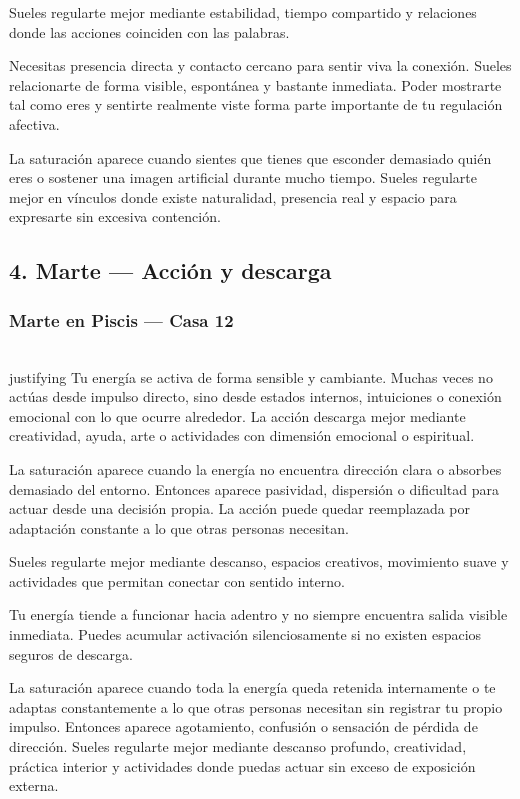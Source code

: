\documentclass[11pt,a4paper]{article}
\begin{document}
Sueles regularte mejor mediante estabilidad, tiempo compartido y relaciones donde las acciones coinciden con las palabras.

Necesitas presencia directa y contacto cercano para sentir viva la conexión. Sueles relacionarte de forma visible, espontánea y bastante inmediata. Poder mostrarte tal como eres y sentirte realmente viste forma parte importante de tu regulación afectiva.

La saturación aparece cuando sientes que tienes que esconder demasiado quién eres o sostener una imagen artificial durante mucho tiempo. Sueles regularte mejor en vínculos donde existe naturalidad, presencia real y espacio para expresarte sin excesiva contención.

\vspace{0.8cm}

\subsection{4. Marte — Acción y descarga}

\subsubsection*{Marte en Piscis — Casa 12}

\\justifying
Tu energía se activa de forma sensible y cambiante. Muchas veces no actúas desde impulso directo, sino desde estados internos, intuiciones o conexión emocional con lo que ocurre alrededor. La acción descarga mejor mediante creatividad, ayuda, arte o actividades con dimensión emocional o espiritual.

La saturación aparece cuando la energía no encuentra dirección clara o absorbes demasiado del entorno. Entonces aparece pasividad, dispersión o dificultad para actuar desde una decisión propia. La acción puede quedar reemplazada por adaptación constante a lo que otras personas necesitan.

Sueles regularte mejor mediante descanso, espacios creativos, movimiento suave y actividades que permitan conectar con sentido interno.

Tu energía tiende a funcionar hacia adentro y no siempre encuentra salida visible inmediata. Puedes acumular activación silenciosamente si no existen espacios seguros de descarga.

La saturación aparece cuando toda la energía queda retenida internamente o te adaptas constantemente a lo que otras personas necesitan sin registrar tu propio impulso. Entonces aparece agotamiento, confusión o sensación de pérdida de dirección. Sueles regularte mejor mediante descanso profundo, creatividad, práctica interior y actividades donde puedas actuar sin exceso de exposición externa.
\end{document}
